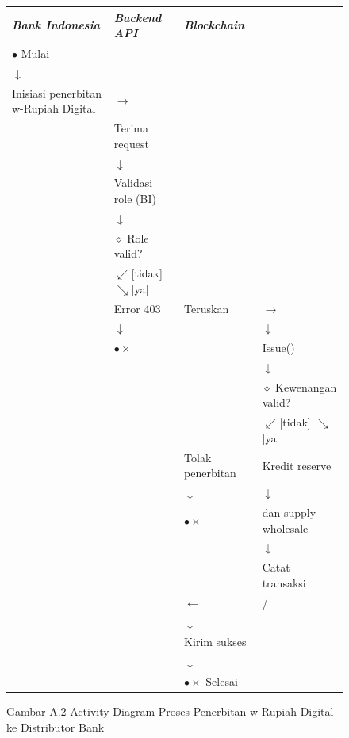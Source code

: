 \documentclass[12pt,a4paper]{article}
\begin{document}
\begin{figure}[H]
\centering
\caption{Gambar A.2 Activity Diagram Proses Penerbitan w-Rupiah Digital ke Distributor Bank}
\label{fig:ad02}
\begin{tabular}{@{}p{3cm}|p{4cm}|p{4cm}@{}}
\textit{\textbf{Bank Indonesia}} & \textit{\textbf{Backend API}} & \textit{\textbf{Blockchain}} \\
\hline
$\bullet$ Mulai & & \\
$\downarrow$ & & \\
Inisiasi penerbitan w-Rupiah Digital & $\rightarrow$ & \\
& Terima request & \\
& $\downarrow$ & \\
& Validasi role (BI) & \\
& $\downarrow$ & \\
& $\diamond$ Role valid? & \\
& $\swarrow$[tidak] \hspace{1.5cm} $\searrow$[ya] & \\
& Error 403 & Teruskan & $\rightarrow$ \\
& $\downarrow$ & & $\downarrow$ \\
& $\bullet\times$ & & Issue() \\
& & & $\downarrow$ \\
& & & $\diamond$ Kewenangan valid? \\
& & & $\swarrow$[tidak] \hspace{1cm} $\searrow$[ya] \\
& & Tolak penerbitan & Kredit reserve\\
& & $\downarrow$ & $\downarrow$ \\
& & $\bullet\times$ & dan supply wholesale \\
& & & $\downarrow$ \\
& & & Catat transaksi \\
& & $\leftarrow$ & / \\
& & $\downarrow$ & \\
& & Kirim sukses & \\
& & $\downarrow$ & \\
& & $\bullet\times$ Selesai & \\
\end{tabular}
\end{figure}
\end{document}
